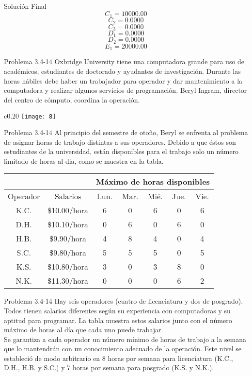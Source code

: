 \documentclass{beamer}
\begin{document}
\begin{frame}[fragile]{Soluci\'on Final}
\[C_{1} = 10 000.00\]
\[C_{2} = 0.0000\]
\[C_{3} = 0.0000\]
\[D_{1} = 0.0000\]
\[D_{2} = 0.0000\]
\[E_{1} = 20 000.00\]

\end{frame}

\begin{frame}[t,fragile]{Problema 3.4-14 }
Oxbridge University tiene una computadora grande para uso de acad\'emicos, estudiantes de doctorado y ayudantes de investigaci\'on. Durante las horas h\'abiles debe haber un trabajador para operador y dar mantenimiento a la computadora y realizar algunos servicios  de programaci\'on. Beryl Ingram, director del centro de c\'omputo, coordina la operaci\'on.
\begin{wrapfigure}{c}{0.20\textwidth}
    \centering
    \texttt{[image: 8]}
\end{wrapfigure}
\end{frame}
\begin{frame}[t,fragile]{Problema 3.4-14 }
Al principio del semestre de  otoño, Beryl se enfrenta al problema de asignar horas de trabajo distintas a sus operadores. Debido a que \'estos son estudiantes de la universidad, est\'an disponibles para el trabajo solo un n\'umero limitado de horas al dia, como se muestra en la tabla. \\

\begin{tabular}{|c|c|c|c|c|c|c|}
\hline 
  &   & \multicolumn{5}{c|}{M\'aximo de horas disponibles} \\ 
\hline 
Operador & Salarios & Lun. & Mar. & Mi\'e. & Jue. & Vie. \\ 
\hline 
K.C. & \$10.00/hora & 6 & 0 & 6 & 0 & 6 \\ 
\hline 
D.H. & \$10.10/hora & 0 & 6 & 0 & 6 & 0 \\ 
\hline 
H.B. & \$9.90/hora & 4 & 8 & 4 & 0 & 4 \\ 
\hline 
S.C. & \$9.80/hora & 5 & 5 & 5 & 0 & 5 \\ 
\hline 
K.S. & \$10.80/hora & 3 & 0 & 3 & 8 & 0 \\ 
\hline 
N.K. & \$11.30/hora & 0 & 0 & 0 & 6 & 2 \\ 
\hline 
\end{tabular} 
\end{frame}
\begin{frame}[t,fragile]{Problema 3.4-14 }
Hay seis operadores (cuatro de licenciatura y dos de posgrado). Todos tienen salarios diferentes seg\'un su experiencia con computadoras y su aptitud para programar. La tabla muestra estos salarios junto con el n\'umero m\'aximo de horas al d\'ia que cada uno puede trabajar.\\
Se garantiza a cada operador un n\'umero m\'inimo de horas de trabajo a la semana que lo mantendr\'an con un conocimiento adecuado de la operaci\'on. Este nivel se estableci\'o de modo arbitrario en 8 horas por semana para licenciatura (K.C., D.H., H.B. y S.C.) y 7 horas por semana para posgrado (K.S. y N.K.).\\
\end{frame}
\end{document}
